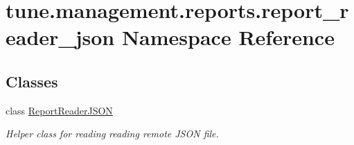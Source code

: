 \hypertarget{namespacetune_1_1management_1_1reports_1_1report__reader__json}{\section{tune.\-management.\-reports.\-report\-\_\-reader\-\_\-json Namespace Reference}
\label{namespacetune_1_1management_1_1reports_1_1report__reader__json}
}
\subsection*{Classes}
\begin{DoxyCompactItemize}
\item 
class \hyperlink{classtune_1_1management_1_1reports_1_1report__reader__json_1_1ReportReaderJSON}{Report\-Reader\-J\-S\-O\-N}
\begin{DoxyCompactList}\small\item\em Helper class for reading reading remote J\-S\-O\-N file. \end{DoxyCompactList}\end{DoxyCompactItemize}
